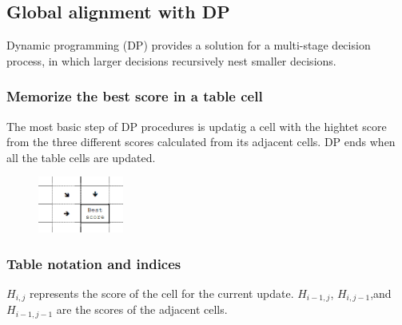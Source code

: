 %
%

%
%
\subsection{Global alignment with DP}
Dynamic programming (DP) provides a solution for a multi-stage decision process, in which larger decisions recursively nest smaller decisions.

\subsubsection*{Memorize the best score in a table cell}

The most basic step of DP procedures is updatig a cell with the hightet score from the three different scores calculated from its adjacent cells. DP ends when all the table cells are updated.

\begin{figure}[H]
  \centering
      \includegraphics[width=0.25\textwidth]{fig02/dynamic_programmoing_cell_update.png}
\end{figure}

%
%	
\subsubsection*{Table notation and indices}
$H_{i,j}$ represents the score of the cell for the current update. $H_{i-1,j}$, $H_{i,j-1}$,and $H_{i-1,j-1}$ are the scores of the adjacent cells.

